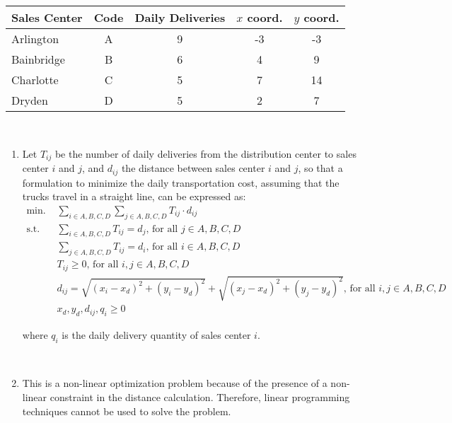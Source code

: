 \documentclass{article}
\begin{document}
\begin{enumerate}
    \begin{center}
        \begin{tabular}{l|c c c c}
        Sales Center & Code & Daily Deliveries & $x$ coord. & $y$ coord. \\
        \hline
        Arlington & A & 9 & -3 & -3\\
        Bainbridge & B & 6 & 4 & 9\\
        Charlotte & C & 5 & 7 & 14\\
        Dryden & D & 5 & 2 & 7
        \end{tabular}
    \end{center}\\
    \begin{enumerate}
        \item Let $T_{ij}$ be the number of daily deliveries from the distribution center to sales center $i$ and $j$, and $d_{ij}$ the distance between sales center $i$ and $j$, so that a formulation to minimize the daily transportation cost, assuming that the trucks travel in a straight line, can be expressed as:
        \begin{equation}\nonumber
            \begin{split}
                \text{min. } & \sum_{i \in {A,B,C,D}} \sum_{j \in {A,B,C,D}} T_{ij} \cdot d_{ij} \\
                \text{s.t. } & \sum_{i \in {A,B,C,D}} T_{ij} = d_j, \, \text{for all } j \in {A,B,C,D} \\
                & \sum_{j \in {A,B,C,D}} T_{ij} = d_i, \, \text{for all } i \in {A,B,C,D} \\
                & T_{ij} \geq 0, \, \text{for all } i,j \in {A,B,C,D} \\
                & d_{ij} = \sqrt{(x_i - x_d)^2 + (y_i - y_d)^2} + \sqrt{(x_j - x_d)^2 + (y_j - y_d)^2}, \, \text{for all } i,j \in {A,B,C,D} \\
                & x_d, y_d, d_{ij}, q_i \geq 0
            \end{split}
        \end{equation}
        \begin{center}
            where $q_i$ is the daily delivery quantity of sales center $i$.
        \end{center}\\
        
        \item This is a non-linear optimization problem because of the presence of a non-linear constraint in the distance calculation. Therefore, linear programming techniques cannot be used to solve the problem. \\


\end{enumerate}
\end{enumerate}
\end{document}
